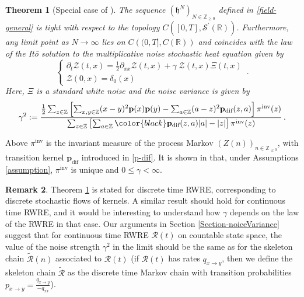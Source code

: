\documentclass[a4paper,11pt,oneside,reqno]{amsart}
\newtheorem{theorem}{Theorem}[section]
\theoremstyle{definition}
\newtheorem{remark}[theorem]{Remark}
\renewcommand{\leq}{\leqslant}
\renewcommand{\geq}{\geqslant}
\numberwithin{equation}{section}
\begin{document}
 
 \begin{theorem}[{Special case of \cite[Theorem 1.4]{parekh2}}]\label{Thm-parekh}
 	The sequence  $(\mathfrak{h}^{N})_{N\in\mathbb{Z}_{\geq 0}}$ defined in \eqref{field-general} is tight with respect to the topology $C\left([0,T],\mathcal{S}^{'}(\mathbb{R})\right)$. Furthermore, any limit point as $N\to \infty$ lies on $C\left((0,T],C(\mathbb{R})\right)$ and coincides with the law of the It\=o solution to the multiplicative noise stochastic heat equation given by  
 	\begin{equation}\label{SHE-parekh}
 		\begin{cases}
 			\partial_{t}\mathcal{Z}(t,x)=\frac{1}{2}\partial_{xx}\mathcal{Z}(t,x)+\gamma \;\mathcal{Z}(t,x)\Xi(t,x)\\
 			\mathcal{Z}(0,x)=\delta_{0}(x)
 		\end{cases}\,.
 	\end{equation}
 	Here, $\Xi$ is a standard white noise and the noise variance is given by 
 	\begin{equation}\label{constan-general}
 		\gamma^{2}:=\frac{\frac{1}{2}\sum_{z\in\mathbb{Z}}\left[\sum_{x,y\in \mathbb{Z}}(x-y)^{2}\mathbf{p}(x)\mathbf{p}(y)-\sum_{a\in \mathbb{Z}}(a-z)^{2}\mathbf{p}_{\text{dif}}(z,a)\right]\pi^{\text{inv}}(z)}{\sum_{z\in \mathbb{Z}}\left[\sum_{a\in \mathbb{Z}}{\color{black}\mathbf{p}_{\text{dif}}(z,a)}|a|-|z|\right]\pi^{\text{inv}}(z)}\,.
 	\end{equation}
 \end{theorem}
 Above $\pi^{\text{inv}}$ is the invariant measure of the process Markov $(Z(n))_{n\in\mathbb{Z}_{\geq 0}}$, with transition kernel $\mathbf{p}_{\text{dif}}$ introduced in \eqref{p-dif}. It is shown in \cite{parekh2} that, under Assumptions \ref{assumption}, $\pi^{\text{inv}}$ is unique and $0\leq \gamma<\infty$. 
 
 \begin{remark}
 	Theorem \ref{Thm-parekh} is stated for discrete time RWRE, corresponding to discrete stochastic flows of kernels. A similar result should hold for continuous time RWRE, and it would be interesting to understand how $\gamma$ depends on the law of the RWRE in that case. Our arguments in Section \ref{Section-noiceVariance} suggest that for continuous time RWRE $\mathcal R(t)$ on  countable state space, the value of the noise strength $\gamma^2$ in the limit should be the same as for the skeleton chain $\widetilde{\mathcal R}(n)$ associated to $\mathcal R(t)$ (if $\mathcal R(t)$ has rates $q_{x\to y}$, then we define the skeleton chain $\widetilde{\mathcal R}$ as the discrete time Markov chain with transition probabilities $p_{x\to y}= \frac{q_{x\to y}}{-q_{xx}}$).
 \end{remark}
 
\end{document}

